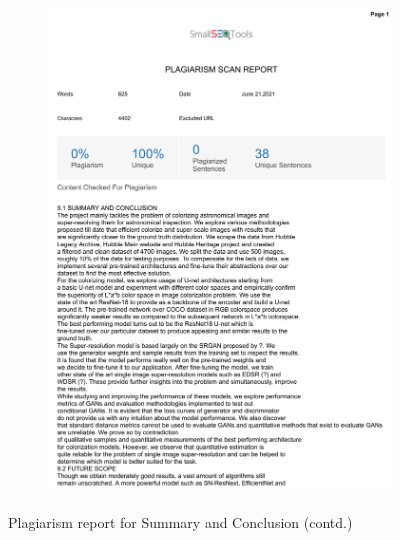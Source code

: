 \documentclass[oneside,a4paper,12pt]{report}
\begin{document}
\begin{appendices}
\begin{figure}
\begin{subfigure}[H]{\textwidth}
    	\includegraphics[scale=0.7, page=2]{plagiarism/summary_conclusion.pdf}
    \end{subfigure}
    \caption{Plagiarism report for Summary and Conclusion (contd.)}
    \label{PlagiarismSummary_1}
\end{figure}

\end{appendices}
\end{document}
